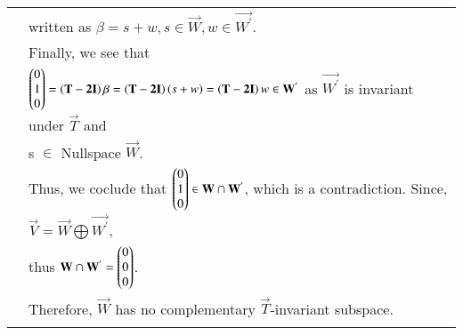 \documentclass[journal,12pt,twocolumn]{IEEEtran}
\begin{document}
\begin{table}[hp]
\begin{tabular}{|l|l|}
        & written as $\beta = s + w, s\in \vec{W}, w \in \vec{W^{'}}$. \\
        & Finally, we see that\\
        &  $\begin{pmatrix}0 \\ 1 \\0\end{pmatrix}= \left(\mathbf{T-2I}\right)\beta = \left(\mathbf{T-2I}\right)\left(s + w\right) =  \left(\mathbf{T-2I}\right)w \in \mathbf{W^{'}} $ as $\vec{W^{'}}$ is invariant under $\vec{T}$ and \\
        & s $\in$ Nullspace $\vec{W}$.\\
        & Thus, we coclude that $\begin{pmatrix}0 \\ 1 \\ 0\end{pmatrix} \in \mathbf{W} \cap \mathbf{W^{'}}$, which is a contradiction. Since, $\vec{V} = \vec{W} \bigoplus \vec{W^{'}}$,  \\
        & thus $\mathbf{W} \cap \mathbf{W^{'}} = \begin{pmatrix}0 \\ 0 \\0\end{pmatrix}$. \\
        & Therefore, $\vec{W}$ has no complementary $\vec{T}$-invariant subspace. \\
        & \\
		\hline
	\end{tabular}
\end{table}	
\end{document}
